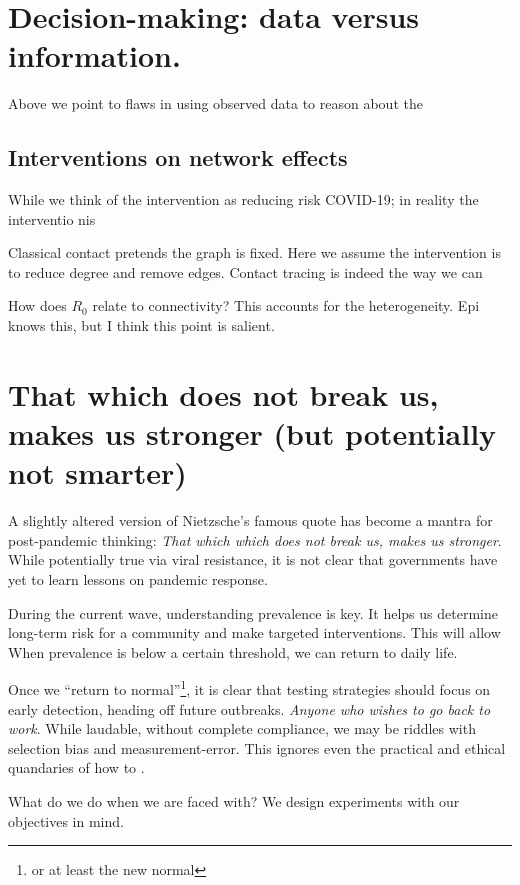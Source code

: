 \documentclass[12pt]{article}
\numberwithin{equation}{section}
\theoremstyle{plain}
\begin{document}
\section{Decision-making: data versus information.}

Above we point to flaws in using observed data to reason about the

\subsection{Interventions on network effects}

While we think of the intervention as reducing risk COVID-19; in reality the interventio nis

Classical contact pretends the graph is fixed.  Here we assume the intervention is to reduce degree and remove edges.  Contact tracing is indeed the way we can

How does $R_0$ relate to connectivity?  This accounts for the heterogeneity. Epi knows this, but I think this point is salient.



\section{That which does not break us, makes us stronger (but potentially not smarter)}

A slightly altered version of Nietzsche's famous quote has become a mantra for post-pandemic thinking: \emph{That which which does not break us, makes us stronger}.  While potentially true via viral resistance, it is not clear that governments have yet to learn lessons on pandemic response.

During the current wave, understanding prevalence is key.  It helps us determine long-term risk for a community and make targeted interventions.  This will allow
When prevalence is below a certain threshold, we can return to daily life.

Once we ``return to normal''\footnote{or at least the new normal}, it is clear that testing strategies should focus on early detection, heading off future outbreaks.
\emph{Anyone who wishes to go back to work}.  While laudable, without complete compliance, we may be riddles with selection bias and measurement-error.  This ignores even the practical and ethical quandaries of how to .

What do we do when we are faced with?  We design experiments with our objectives in mind.
\end{document}
